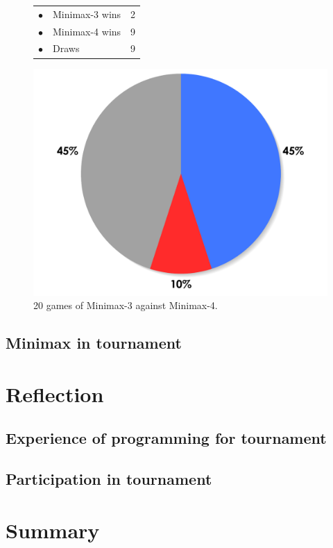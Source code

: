 \documentclass[paper=a4, fontsize=11pt]{article} %
\newcommand{\ra}[1]{\renewcommand{\arraystretch}{#1}}
\begin{document}
\begin{figure}[ht]
    \begin{minipage}[c]{0.40\linewidth}
        \centering
        \ra{1.3}
        \begin{tabular}{cll}
            \toprule
            \textcolor{red!100}{$\bullet$} & Minimax-3 wins & 2       \\
            \textcolor{blue!100!yellow!100!red!80}{$\bullet$} & Minimax-4 wins & 9      \\  
            \textcolor{gray!100}{$\bullet$} & Draws & 9      \\  
            \bottomrule
        \end{tabular}
    \end{minipage}
    \begin{minipage}[c]{0.60\linewidth}
        \centering
        \includegraphics[scale=0.35]{img/minimax3-minimax4.pdf}
    \end{minipage}
    \caption{20 games of Minimax-3 against Minimax-4.}
    \label{fig:minimax3-minimax4}
\end{figure}

\subsection{Minimax in tournament}

\section{Reflection}
\subsection{Experience of programming for tournament}
\subsection{Participation in tournament}
\section{Summary}
\begin{flushleft}
%
\end{flushleft}
\end{document}
